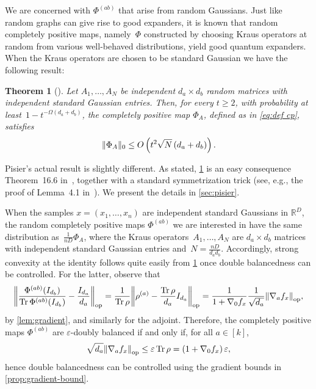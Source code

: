 \documentclass[aos]{imsart}
\newtheorem{theorem}{Theorem}[section]
\theoremstyle{definition}
\numberwithin{equation}{section}
\DeclareMathOperator{\op}{op}
\DeclareMathOperator{\tr}{Tr}
\DeclarePairedDelimiter{\norm}{\lVert}{\rVert}
\newcommand{\R}{{\mathbb{R}}}
\newcommand{\eps}{\varepsilon}
\begin{document}
We are concerned with $\Phi^{(ab)}$ that arise from random Gaussians.
Just like random graphs can give rise to good expanders, it is known that random completely positive maps, namely~$\Phi$ constructed by choosing Kraus operators at random from various well-behaved distributions, yield good quantum expanders.
When the Kraus operators are chosen to be standard Gaussian we have the following result:

\begin{theorem}[\cite{pisier2012grothendieck,P14}]\label{thm:hess-pisier}
Let $A_1,\dots,A_N$ be independent $d_a\times d_b$ random matrices with independent standard Gaussian entries.
Then, for every $t \geq 2$, with probability at least~$1 - t^{-\Omega(d_a + d_b)}$, the completely positive map $\Phi_A$, defined as in \cref{eq:def cp}, satisfies
\begin{align*}
  \norm{\Phi_A}_0 \leq O\left(t^{2} \sqrt N \left( d_a + d_b \right)\right).
\end{align*}
\end{theorem}

Pisier's actual result is slightly different.
As stated, \cref{thm:hess-pisier} is an easy consequence Theorem~16.6 in~\cite{pisier2012grothendieck}, together with a standard symmetrization trick (see, e.g., the proof of Lemma~4.1 in~\cite{P14}).
We present the details in \cref{sec:pisier}.

When the samples $x=(x_1,\dots,x_n)$ are independent standard Gaussians in $\R^D$,
the random completely positive maps $\Phi^{(ab)}$ we are interested in have the same distribution as~$\frac1{nD}\Phi_A$, where the Kraus operators~$A_1,\dots,A_N$ are $d_a \times d_b$ matrices with independent standard Gaussian entries and~$N=\frac{nD}{d_ad_b}$.
Accordingly, strong convexity at the identity follows quite easily from \cref{thm:hess-pisier} once double balancedness can be controlled.
For the latter, observe that
\begin{align*}
  \norm*{\frac{\Phi^{(ab)}(I_{d_b})}{\tr \Phi^{(ab)}(I_{d_b})} - \frac{I_{d_a}}{d_a}}_{\op}
= \frac1{\tr\rho} \norm*{\rho^{(a)} - \frac{\tr \rho}{d_a} I_{d_a}}_{\op}
= \frac1{1 + \nabla_0 f_x} \frac1{\sqrt{d_a}} \norm*{\nabla_a f_x}_{\op},
\end{align*}
by \cref{lem:gradient}, and similarly for the adjoint.
Therefore, the completely positive maps $\Phi^{(ab)}$ are $\eps$-doubly balanced if and only if, for all $a\in[k]$,
\begin{align}\label{eq:balanced via grad}
  \sqrt{d_a} \norm*{\nabla_a f_x}_{\op} \leq \eps \tr \rho = \left( 1 + \nabla_0 f_x \right) \eps,
\end{align}
hence double balancedness can be controlled using the gradient bounds in \cref{prop:gradient-bound}.
\end{document}
